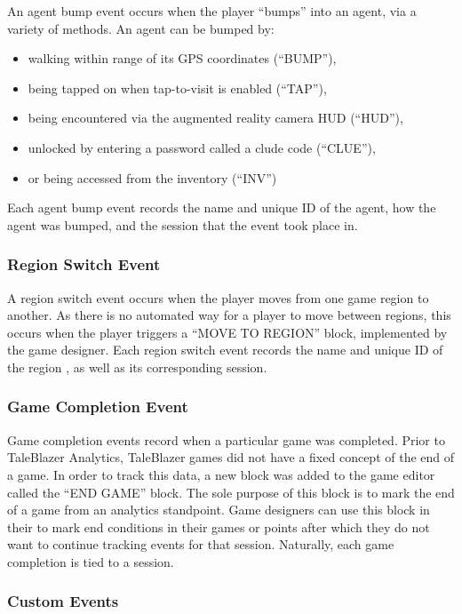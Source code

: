 An agent bump event occurs when the player ``bumps'' into an agent, via a variety of methods. An agent can be bumped by:
	\begin{itemize}
		\item walking within range of its GPS coordinates (``BUMP''),
		\item being tapped on when tap-to-visit is enabled (``TAP''),
		\item being encountered via the augmented reality camera HUD (``HUD''),
		\item unlocked by entering a password called a clude code (``CLUE''),
		\item or being accessed from the inventory (``INV'')
	\end{itemize}

Each agent bump event records the name and unique ID of the agent, how the agent was bumped, and the session that the event took place in. 

\subsubsection{Region Switch Event}

A region switch event occurs when the player moves from one game region to another. As there is no automated way for a player to move between regions, this occurs when the player triggers a ``MOVE TO REGION'' block, implemented by the game designer. Each region switch event records the name and unique ID of the region , as well as its corresponding session.

\subsubsection{Game Completion Event}

Game completion events record when a particular game was completed. Prior to TaleBlazer Analytics, TaleBlazer games did not have a fixed concept of the end of a game. In order to track this data, a new block was added to the game editor called the ``END GAME'' block. The sole purpose of this block is to mark the end of a game from an analytics standpoint. Game designers can use this block in their to mark end conditions in their games or points after which they do not want to continue tracking events for that session. Naturally, each game completion is tied to a session. 

\subsubsection{Custom Events}


